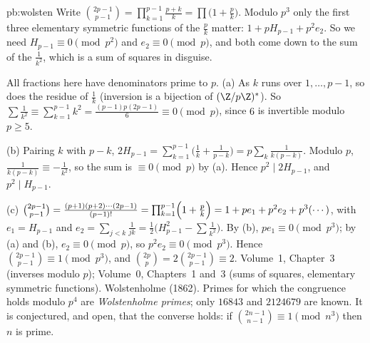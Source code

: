 \begin{solution}{pb:wolsten}
\idea Write $\binom{2p-1}{p-1}=\prod_{k=1}^{p-1}\frac{p+k}k=\prod\bigl(1+\frac pk\bigr)$. Modulo $p^3$ only the first three elementary symmetric
functions of the $\frac pk$ matter: $1+pH_{p-1}+p^2e_2$. So we need $H_{p-1}\equiv0\pmod{p^2}$ and $e_2\equiv0\pmod p$, and both come down
to the sum of the $\frac1{k^2}$, which is a sum of squares in disguise.

\writeup All fractions here have denominators prime to $p$. (a) As $k$ runs over $1,\dots,p-1$, so does the residue of $\frac1k$
(inversion is a bijection of $(\Z/p\Z)^*$). So $\sum\frac1{k^2}\equiv\sum_{k=1}^{p-1}k^2=\frac{(p-1)p(2p-1)}6\equiv0\pmod p$, since $6$ is
invertible modulo $p\ge5$.

(b) Pairing $k$ with $p-k$, $2H_{p-1}=\sum_{k=1}^{p-1}\bigl(\frac1k+\frac1{p-k}\bigr)=p\sum_k\frac1{k(p-k)}$. Modulo $p$,
$\frac1{k(p-k)}\equiv-\frac1{k^2}$, so the sum is $\equiv0\pmod p$ by (a). Hence $p^2\mid2H_{p-1}$, and $p^2\mid H_{p-1}$.

(c) $\binom{2p-1}{p-1}=\frac{(p+1)(p+2)\cdots(2p-1)}{(p-1)!}=\prod_{k=1}^{p-1}\Bigl(1+\frac pk\Bigr)=1+pe_1+p^2e_2+p^3(\cdots)$, with
$e_1=H_{p-1}$ and $e_2=\sum_{j<k}\frac1{jk}=\frac12\bigl(H_{p-1}^2-\sum\frac1{k^2}\bigr)$. By (b), $pe_1\equiv0\pmod{p^3}$; by (a) and (b),
$e_2\equiv0\pmod p$, so $p^2e_2\equiv0\pmod{p^3}$. Hence $\binom{2p-1}{p-1}\equiv1\pmod{p^3}$, and $\binom{2p}p=2\binom{2p-1}{p-1}\equiv2$.
\tools Volume~1, Chapter~3 (inverses modulo $p$); Volume~0, Chapters~1 and~3 (sums of squares, elementary symmetric functions).
\leads Wolstenholme (1862). Primes for which the congruence holds modulo $p^4$ are \emph{Wolstenholme primes}; only $16843$ and $2124679$ are
known. It is conjectured, and open, that the converse holds: if $\binom{2n-1}{n-1}\equiv1\pmod{n^3}$ then $n$ is prime.
\end{solution}

